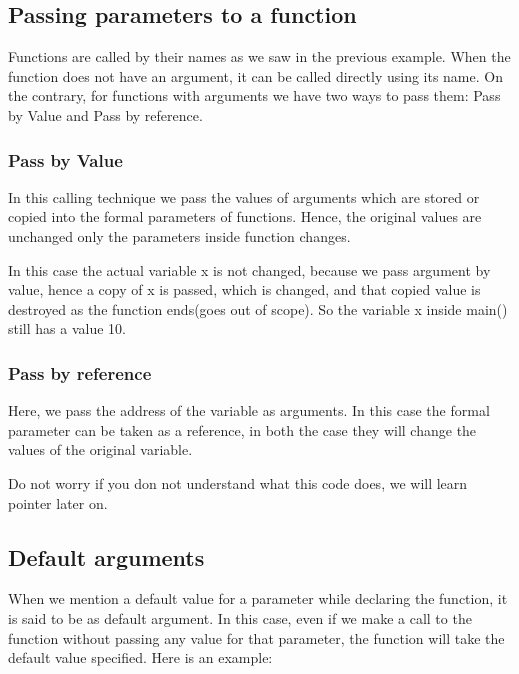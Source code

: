 \documentclass[11pt, a4paper]{article}
\begin{document}
\subsection{Passing parameters to a function}
Functions are called by their names as we saw in the previous example. When the function
does not have an argument, it can be called directly using its name.
On the contrary, for functions with arguments we have two ways to pass them:
Pass by Value and Pass by reference.

\subsubsection{Pass by Value}
In this calling technique we pass the values of arguments which
are stored or copied into the formal parameters of functions.
Hence, the original values are unchanged only the parameters inside
function changes.

In this case the actual variable x is not changed, because we pass argument
by value, hence a copy of x is passed, which is changed, and that copied value
is destroyed as the function ends(goes out of scope). So the variable x inside
main() still has a value 10.

\subsubsection{Pass by reference}
Here, we pass the address of the variable as arguments. In this case
the formal parameter can be taken as a reference, in both
the case they will change the values of the original variable.

Do not worry if you don not understand what this code does, we will learn
pointer later on.

\subsection{Default arguments}
When we mention a default value for a parameter while declaring the function,
it is said to be as default argument. In this case, even if we make a call to
the function without passing any value for that parameter, the function will
take the default value specified. Here is an example:

\end{document}
